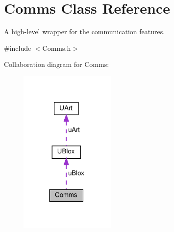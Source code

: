 \hypertarget{class_comms}{}\section{Comms Class Reference}
\label{class_comms}


A high-\/level wrapper for the communication features.  




{\ttfamily \#include $<$Comms.\+h$>$}



Collaboration diagram for Comms\+:
\nopagebreak
\begin{figure}[H]
\begin{center}
\leavevmode
\includegraphics[width=134pt]{d4/d7a/class_comms__coll__graph}
\end{center}
\end{figure}
